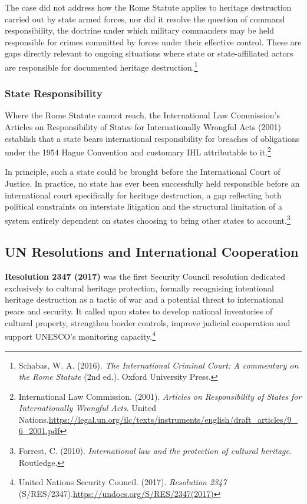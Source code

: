 The case did not address how the Rome Statute applies to heritage destruction carried out by state armed forces, nor did it resolve the question of command responsibility, the doctrine under which military commanders may be held responsible for crimes committed by forces under their effective control. These are gaps directly relevant to ongoing situations where state or state-affiliated actors are responsible for documented heritage destruction.\footnote{Schabas, W. A. (2016). \emph{The International Criminal Court: A commentary on the Rome Statute} (2nd ed.). Oxford University Press.}

\subsubsection{State Responsibility}

Where the Rome Statute cannot reach, the International Law Commission's Articles on Responsibility of States for Internationally Wrongful Acts (2001) establish that a state bears international responsibility for breaches of obligations under the 1954 Hague Convention and customary IHL attributable to it.\footnote{International Law Commission. (2001). \emph{Articles on Responsibility of States for Internationally Wrongful Acts}. United Nations.\url{https://legal.un.org/ilc/texts/instruments/english/draft_articles/9_6_2001.pdf}}

In principle, such a state could be brought before the International Court of Justice. In practice, no state has ever been successfully held responsible before an international court specifically for heritage destruction, a gap reflecting both political constraints on interstate litigation and the structural limitation of a system entirely dependent on states choosing to bring other states to account.\footnote{Forrest, C. (2010). \emph{International law and the protection of cultural heritage}. Routledge.}

\subsection{UN Resolutions and International Cooperation}

\textbf{Resolution 2347 (2017)} was the first Security Council resolution dedicated exclusively to cultural heritage protection, formally recognising intentional heritage destruction as a tactic of war and a potential threat to international peace and security. It called upon states to develop national inventories of cultural property, strengthen border controls, improve judicial cooperation and support UNESCO's monitoring capacity.\footnote{United Nations Security Council. (2017). \emph{Resolution 2347} (S/RES/2347).\url{https://undocs.org/S/RES/2347(2017)}}

